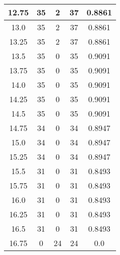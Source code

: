 \documentclass[letterpaper, 12pt]{article}
\begin{document}
\begin{longtable}{|c|c|c|c|c|}
\hline
12.75 & 35 & 2 & 37 & 0.8861 \\
\hline
13.0 & 35 & 2 & 37 & 0.8861 \\
\hline
13.25 & 35 & 2 & 37 & 0.8861 \\
\hline
13.5 & 35 & 0 & 35 & 0.9091 \\
\hline
13.75 & 35 & 0 & 35 & 0.9091 \\
\hline
14.0 & 35 & 0 & 35 & 0.9091 \\
\hline
14.25 & 35 & 0 & 35 & 0.9091 \\
\hline
14.5 & 35 & 0 & 35 & 0.9091 \\
\hline
14.75 & 34 & 0 & 34 & 0.8947 \\
\hline
15.0 & 34 & 0 & 34 & 0.8947 \\
\hline
15.25 & 34 & 0 & 34 & 0.8947 \\
\hline
15.5 & 31 & 0 & 31 & 0.8493 \\
\hline
15.75 & 31 & 0 & 31 & 0.8493 \\
\hline
16.0 & 31 & 0 & 31 & 0.8493 \\
\hline
16.25 & 31 & 0 & 31 & 0.8493 \\
\hline
16.5 & 31 & 0 & 31 & 0.8493 \\
\hline
16.75 & 0 & 24 & 24 & 0.0 \\
\hline
\end{longtable}
\end{document}
